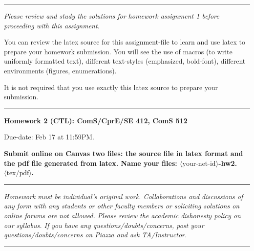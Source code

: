 \documentclass[11pt]{article}
\begin{document}
\hrule
\smallskip

\noindent
\emph{Please review and study the solutions for homework assignment 1
before proceeding with this assignment. }

\noindent
You can review the latex source for this assignment-file to
learn and use latex to prepare your homework submission. You will see
the use of macros (to write uniformly formatted text), different
text-styles (emphasized, bold-font), different environments (figures,
enumerations).

It is not required that you use exactly this latex source to prepare
your submission. 
\smallskip
\hrule


\begin{center}
{\Large\bf Homework 2 (CTL): ComS/CprE/SE 412, ComS 512}

\medskip

Due-date: Feb 17 at 11:59PM.

\medskip


\end{center}

\noindent
\textbf{
Submit online on Canvas two files: the source file in latex format and
the pdf file generated from latex. Name your files:
$\langle\mbox{your-net-id}\rangle$-hw2.$\langle\mbox{tex/pdf}\rangle$.
}

\hrule
\noindent
\smallskip

\emph{ Homework must be individual's original work. Collaborations and
  discussions of any form with any students or other faculty members
  or soliciting solutions on online forums are not allowed. Please
  review the academic dishonesty policy on our syllabus. If you have
  any questions/doubts/concerns, post your questions/doubts/concerns
  on Piazza and ask TA/Instructor.}

\smallskip
\hrule
\end{document}
